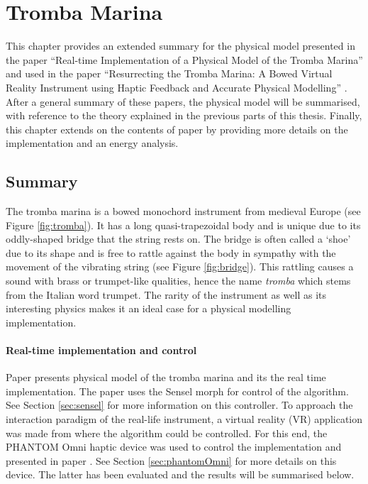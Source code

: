 \chapter{Tromba Marina}\label{ch:tromba}
This chapter provides an extended summary for the physical model presented in the paper ``Real-time Implementation of a Physical Model of the Tromba Marina'' \citeP[D] and used in the paper ``Resurrecting the Tromba Marina: A Bowed Virtual Reality Instrument using Haptic Feedback and Accurate Physical Modelling'' \citeP[E]. After a general summary of these papers, the physical model will be summarised, with reference to the theory explained in the previous parts of this thesis. Finally, this chapter extends on the contents of paper \citeP[D] by providing more details on the implementation and an energy analysis.

\section{Summary}
The tromba marina is a bowed monochord instrument from medieval Europe (see Figure \ref{fig:tromba}). It has a long quasi-trapezoidal body and is unique due to its oddly-shaped bridge that the string rests on. The bridge is often called a `shoe' due to its shape and is free to rattle against the body in sympathy with the movement of the vibrating string (see Figure \ref{fig:bridge}). This rattling causes a sound with brass or trumpet-like qualities, hence the name \textit{tromba} which stems from the Italian word trumpet. The rarity of the instrument as well as its interesting physics makes it an ideal case for a physical modelling implementation.

\subsubsection{Real-time implementation and control}
Paper \citeP[D] presents physical model of the tromba marina and its the real time implementation. The paper uses the Sensel morph for control of the algorithm. See Section \ref{sec:sensel} for more information on this controller. To approach the interaction paradigm of the real-life instrument, a virtual reality (VR) application was made from where the algorithm could be controlled. For this end, the PHANTOM Omni haptic device was used to control the implementation and presented in paper \citeP[E]. See Section \ref{sec:phantomOmni} for more details on this device. The latter has been evaluated and the results will be summarised below.


